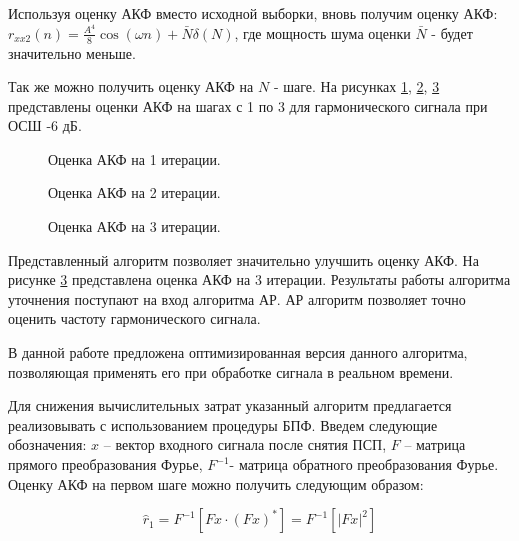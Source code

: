 Используя оценку АКФ вместо исходной выборки, вновь получим оценку АКФ:
${r_{xx2}(n) = \frac{A^4}{8} \cos{(\omega n)} + \bar{N} \delta{(N)}}$,
где мощность шума оценки ${\bar{N}}$ - будет значительно меньше.

Так же можно получить оценку АКФ на ${N}$ - шаге. На рисунках \ref{pic:acf_1_iter},
\ref{pic:acf_2_iter}, \ref{pic:acf_3_iter} представлены оценки АКФ на шагах с 1 по 3 для гармонического сигнала при ОСШ -6 дБ.

\begin{figure}[H]
	\center{}
	\caption{Оценка АКФ на 1 итерации.}
	\label{pic:acf_1_iter}
\end{figure}

\begin{figure}[H]
	\center{}
	\caption{Оценка АКФ на 2 итерации.}
	\label{pic:acf_2_iter}
\end{figure}

\begin{figure}[H]
	\center{}
	\caption{Оценка АКФ на 3 итерации.}
	\label{pic:acf_3_iter}
\end{figure}

Представленный алгоритм позволяет значительно улучшить оценку АКФ. На рисунке \ref{pic:acf_3_iter} представлена оценка АКФ на 3 итерации.
Результаты работы алгоритма уточнения поступают на вход алгоритма АР. АР алгоритм позволяет точно оценить частоту гармонического сигнала.

В данной работе предложена оптимизированная версия данного алгоритма, позволяющая применять его при обработке сигнала в реальном времени.

Для снижения вычислительных затрат указанный алгоритм предлагается реализовывать с использованием процедуры БПФ. 
Введем следующие обозначения: ${x}$ – вектор входного сигнала после снятия ПСП, ${F}$ – матрица прямого преобразования Фурье, ${F^{-1}}$- матрица обратного преобразования Фурье.
Оценку АКФ на первом шаге можно получить следующим образом:

\begin{center}
\begin{equation}
	\label{eq:akf_1}
	\hat{r}_1 = F^{-1}\left[ Fx \cdot (Fx)^* \right] = F^{-1} \left[ \left| Fx \right| ^2 \right]
\end{equation}
\end{center}

